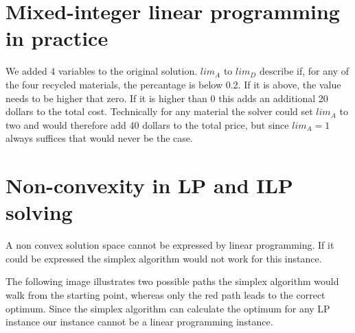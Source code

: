 \documentclass{base}
\begin{document}



\section*{Mixed-integer linear programming in practice}



We added 4 variables to the original solution. $lim_A$ to $lim_D$ describe if, for any of the four recycled materials, the percantage is below 0.2.
If it is above, the value needs to be higher that zero. If it is higher than 0 this adds an additional 20 dollars to the total cost.
Technically for any material the solver could set $lim_A$ to two and would therefore add 40 dollars to the total price, but since $lim_A=1$ always suffices that would never be the case.

\clearpage
\section*{Non-convexity in LP and ILP solving}
A non convex solution space cannot be expressed by linear programming.
If it could be expressed the simplex algorithm would not work for this instance.

The following image illustrates two possible paths the simplex algorithm would walk from the starting point, whereas only the red path leads to the correct optimum.
Since the simplex algorithm can calculate the optimum for any LP instance our instance cannot be a linear programming instance.
\end{document}
